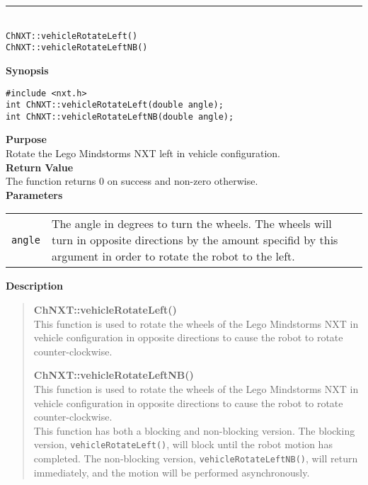 \noindent
\vspace{5pt}
\rule{4.5in}{0.015in}\\
\noindent
{\LARGE \texttt{ChNXT::vehicleRotateLeft()}}\\
{\LARGE \texttt{ChNXT::vehicleRotateLeftNB()}}\\
{}

\noindent
{\bf Synopsis}
\begin{lstlisting}
#include <nxt.h>
int ChNXT::vehicleRotateLeft(double angle);
int ChNXT::vehicleRotateLeftNB(double angle);
\end{lstlisting}

\noindent
{\bf Purpose}\\
Rotate the Lego Mindstorms NXT left in vehicle configuration.\\

\noindent
{\bf Return Value}\\
The function returns 0 on success and non-zero otherwise.\\

\noindent
{\bf Parameters}\\
\vspace{-0.1in}
\begin{description}
\item               
\begin{tabular}{p{10 mm}p{145 mm}}
\texttt{angle} & The angle in degrees to turn the wheels. The wheels will turn 
    in opposite directions by the amount specifid by this argument in order to 
    rotate the robot to the left. \\
\end{tabular}
\end{description}

\noindent
{\bf Description}\\
\vspace{-12pt}
\begin{quote}
{\bf ChNXT::vehicleRotateLeft()}\\
This function is used to rotate the wheels of the Lego Mindstorms NXT in vehicle configuration in opposite directions to cause the robot to rotate counter-clockwise.

{\bf ChNXT::vehicleRotateLeftNB()}\\
This function is used to rotate the wheels of the Lego Mindstorms NXT in vehicle configuration in opposite directions to cause the robot to rotate counter-clockwise.\\
\newline
This function has both a blocking and non-blocking version.
The blocking version, \texttt{vehicleRotateLeft()}, will block until the
robot motion has completed. The non-blocking version, \texttt{vehicleRotateLeftNB()},
will return immediately, and the motion will be performed asynchronously.\\
\end{quote}


